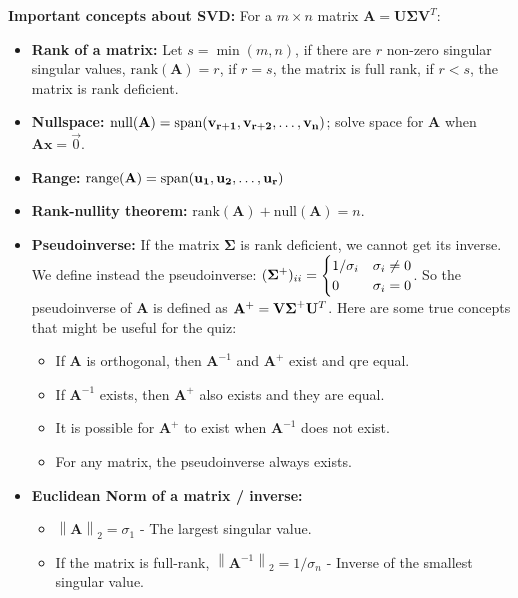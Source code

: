 \documentclass[12pt]{article}
\newcommand\norm[1]{\left\lVert#1\right\rVert}
\begin{document}
\newpage
\noindent \textbf{Important concepts about SVD:} For a $m \times n$ matrix $\mathbf{A} = \mathbf{U\Sigma V}^T$:
    \begin{itemize}
        \item \textbf{Rank of a matrix:} Let $s = \min(m, n)$, if there are $r$ non-zero singular singular values, $\text{rank}(\mathbf{A}) = r$, if $r = s$, the matrix is full rank, if $r < s$, the matrix is rank deficient.
        \item \textbf{Nullspace:} $\text{null}(\bf{A}) = \text{span}({\bf v}_{r+1}, {\bf v}_{r+2}, \dots, {\bf v}_{n})$; solve space for $\mathbf{A}$ when $\mathbf{Ax} = \vec{0}$.
        \item \textbf{Range:} $\text{range}(\bf{A}) = \text{span}(\bf{u}_1, \bf{u}_2, \dots, \bf{u}_r)$
        \item \textbf{Rank-nullity theorem:} $\text{rank}(\mathbf{A}) + \text{null}(\mathbf{A}) = n$.
        \item \textbf{Pseudoinverse:} If the matrix $\mathbf{\Sigma}$ is rank deficient, we cannot get its inverse. We define instead the pseudoinverse: $\displaystyle ({\bf \Sigma}^+)_{ii} = \begin{cases} 1/{\sigma_i} & \sigma_i \neq 0\\ 0 & \sigma_i = 0 \end{cases}$. So the pseudoinverse of $\mathbf{A}$ is defined as ${\bf A}^{+} = {\bf V\Sigma}^{+}{\bf U}^T$. Here are some true concepts that might be useful for the quiz:
            \begin{itemize}[label={\checkmark}]
                \item If $\mathbf{A}$ is orthogonal, then $\mathbf{A}^{-1}$ and $\mathbf{A}^+$ exist and qre equal.
                \item If $\mathbf{A}^{-1}$ exists, then $\mathbf{A}^+$ also exists and they are equal.
                \item It is possible for $\mathbf{A}^+$ to exist when $\mathbf{A}^{-1}$ does not exist.
                \item For any matrix, the pseudoinverse always exists.
            \end{itemize}
        \item \textbf{Euclidean Norm of a matrix / inverse:}
            \begin{itemize}
                \item $\norm{\mathbf{A}}_2= \sigma_1$ - The largest singular value.
                \item If the matrix is full-rank, $\norm{\mathbf{A}^{-1}}_2= 1/{\sigma_n}$ - Inverse of the smallest singular value.

\end{itemize}
\end{itemize}
\end{document}
